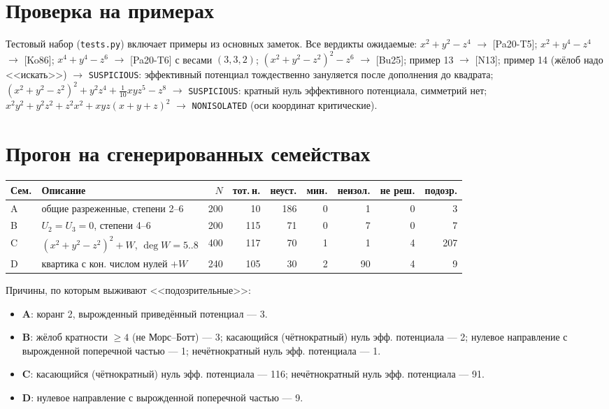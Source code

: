 \documentclass[11pt,a4paper]{article}
\begin{document}
\section{Проверка на примерах}
Тестовый набор (\texttt{tests.py}) включает примеры из основных заметок. Все вердикты ожидаемые:
$x^2+y^2-z^4$ $\to$ [Pa20-T5]; $x^2+y^4-z^4$ $\to$ [Ko86]; $x^4+y^4-z^6$ $\to$ [Pa20-T6] с весами
$(3,3,2)$; $(x^2+y^2-z^2)^2-z^6$ $\to$ [Bu25]; пример 13 $\to$ [N13]; пример 14 (жёлоб надо <<искать>>)
$\to$ \texttt{SUSPICIOUS}: эффективный потенциал тождественно зануляется после дополнения до квадрата;
$(x^2+y^2-z^2)^2+y^2z^4+\frac1{10}xyz^5-z^8$ $\to$ \texttt{SUSPICIOUS}: кратный нуль эффективного потенциала,
симметрий нет; $x^2y^2+y^2z^2+z^2x^2+xyz(x+y+z)^2$ $\to$ \texttt{NONISOLATED} (оси координат критические).

\section{Прогон на сгенерированных семействах}
\begin{center}\footnotesize\setlength{\tabcolsep}{4pt}
\begin{tabular}{llrrrrrrr}
\toprule
Сем. & Описание & $N$ & тот.\,н. & неуст. & мин. & неизол. & не реш. & подозр.\\
\midrule
A & общие разреженные, степени 2--6 & 200 & 10 & 186 & 0 & 1 & 0 & 3\\
B & $U_2=U_3=0$, степени 4--6 & 200 & 115 & 71 & 0 & 7 & 0 & 7\\
C & $(x^2+y^2-z^2)^2+W$, $\deg W=5..8$ & 400 & 117 & 70 & 1 & 1 & 4 & 207\\
D & квартика с кон. числом нулей $+W$ & 240 & 105 & 30 & 2 & 90 & 4 & 9\\
\bottomrule
\end{tabular}
\end{center}
Причины, по которым выживают <<подозрительные>>:
\begin{itemize}[leftmargin=*]
\item \textbf{A}: коранг 2, вырожденный приведённый потенциал --- 3.
\item \textbf{B}: жёлоб кратности $\ge4$ (не Морс--Ботт) --- 3; касающийся (чётнократный) нуль эфф. потенциала --- 2; нулевое направление с вырожденной поперечной частью --- 1; нечётнократный нуль эфф. потенциала --- 1.
\item \textbf{C}: касающийся (чётнократный) нуль эфф. потенциала --- 116; нечётнократный нуль эфф. потенциала --- 91.
\item \textbf{D}: нулевое направление с вырожденной поперечной частью --- 9.
\end{itemize}
\end{document}
